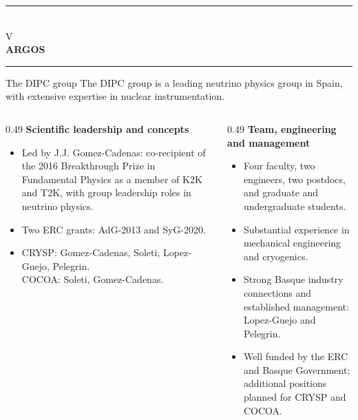 \documentclass[aspectratio=169,11pt]{beamer}
\newcommand{\hi}[1]{\textcolor{crRed}{#1}}
\begin{document}
\begin{frame}
\centering
\vspace{1.6cm}
{\color{crBlue}\rule{0.55\textwidth}{1.1pt}}\\[6mm]
{\Large\color{crGrey} V}\\[4mm]
{\Huge\bfseries\color{crBlue} ARGOS}\\[6mm]
{\color{crBlue}\rule{0.55\textwidth}{1.1pt}}
\end{frame}

\begin{frame}{The DIPC group}
\small
The DIPC group is a leading neutrino physics group in Spain, with extensive expertise in \hi{nuclear instrumentation}.
\par\vspace{2mm}
\begin{columns}[T,onlytextwidth]
\begin{column}{0.49\textwidth}
\textbf{Scientific leadership and concepts}
\begin{itemize}
\item Led by \hi{J.J. Gomez-Cadenas}: co-recipient of the \hi{2016 Breakthrough Prize in Fundamental Physics} as a member of K2K and T2K, with group leadership roles in neutrino physics.
\item Two ERC grants: \hi{AdG-2013 and SyG-2020}.
\item \hi{CRYSP}: Gomez-Cadenas, Soleti, Lopez-Guejo, Pelegrin.\\
\hi{COCOA}: Soleti, Gomez-Cadenas.
\end{itemize}
\end{column}
\begin{column}{0.49\textwidth}
\textbf{Team, engineering and management}
\begin{itemize}
\item Four faculty, two engineers, two postdocs, and graduate and undergraduate students.
\item Substantial experience in mechanical engineering and cryogenics.
\item Strong Basque industry connections and established management: Lopez-Guejo and Pelegrin.
\item Well funded by the ERC and Basque Government; additional positions planned for CRYSP and COCOA.
\end{itemize}
\end{column}
\end{columns}
\end{frame}
\end{document}
